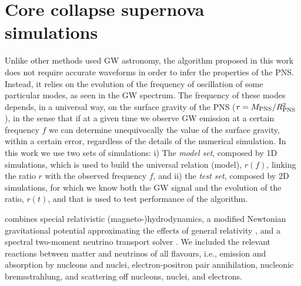 \section{Core collapse supernova simulations}
\label{sec:simulations}



{Unlike other methods used GW astronomy, the} algorithm proposed in {this work} does not require accurate
waveforms {in order to infer the properties of the PNS.} {Instead, it relies on the evolution of the
frequency of oscillation of some particular modes, as seen in the GW spectrum.
The frequency of these modes depends, in a universal way, on the surface gravity of the PNS
($r=M_{\rm PNS}/R_{\rm PNS}^2$), in the sense that if at a given time we observe GW emission at a certain
frequency $f$ we can determine unequivocally the value of the surface gravity, within a certain error,
regardless of the details of the numerical simulation. In this work we use two sets of simulations: i)
The {\it model set}, composed by 1D simulations, which is used to build the universal relation (model),
$r(f)$, linking the ratio $r$ with the observed frequency $f$, and ii) the {\it test set}, composed by
2D simulations, 
for which we know both the GW signal and the evolution of the ratio, $r (t)$, and that is used to test
performance of the algorithm.}

combines special relativistic (magneto-)hydrodynamics, a modified
Newtonian gravitational potential approximating the effects of general
relativity \citep{Marek_etal__2006__AA__TOV-potential}, and a spectral
two-moment neutrino transport solver
\citep{Just_et_al__2015__mnras__Anewmultidimensionalenergy-dependenttwo-momenttransportcodeforneutrino-hydrodynamics}.
We included the relevant reactions between matter and neutrinos of all
flavours, i.e., emission and absorption by nucleons and nuclei,
electron-positron pair annihilation, nucleonic bremsstrahlung, and
scattering off nucleons, nuclei, and electrons.

